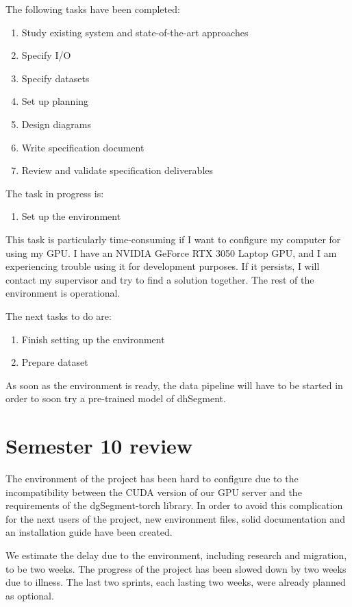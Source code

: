 \documentclass{polytech/polytech}
\numberwithin{figure}{chapter}
\begin{document}
The following tasks have been completed:
\begin{enumerate}
\item Study existing system and state-of-the-art approaches
\item Specify I/O
\item Specify datasets
\item Set up planning
\item Design diagrams
\item Write specification document
\item Review and validate specification deliverables
\end{enumerate}

The task in progress is:
\begin{enumerate}
\item Set up the environment
\end{enumerate}

This task is particularly time-consuming if I want to configure my computer for using my GPU.
I have an NVIDIA GeForce RTX 3050 Laptop GPU, and I am experiencing trouble using it for development purposes.
If it persists, I will contact my supervisor and try to find a solution together.
The rest of the environment is operational.

The next tasks to do are:
\begin{enumerate}
\item Finish setting up the environment
\item Prepare dataset
\end{enumerate}

As soon as the environment is ready, the data pipeline will have to be started in order to soon try a pre-trained model of dhSegment.

\section{Semester 10 review}


The environment of the project has been hard to configure due to the incompatibility between the CUDA version of our GPU server and the requirements of the dgSegment-torch library.
In order to avoid this complication for the next users of the project, new environment files, solid documentation and an installation guide have been created.

We estimate the delay due to the environment, including research and migration, to be two weeks.
The progress of the project has been slowed down by two weeks due to illness.
The last two sprints, each lasting two weeks, were already planned as optional.
\end{document}
